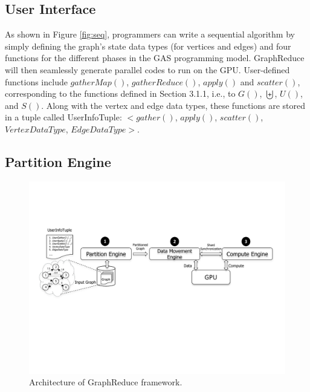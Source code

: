 \subsection{User Interface}
\label{interface}


As shown in Figure \ref{fig:seq}, programmers can write a sequential algorithm by simply defining the graph's state data types 
(for vertices and edges) and four functions for the different phases in the GAS programming model. 
GraphReduce will then seamlessly generate parallel codes to run on the GPU. User-defined functions 
include $gatherMap()$, $gatherReduce()$, $apply()$ and $scatter ()$, corresponding to the functions defined in Section 3.1.1,
i.e., to $G()$, $\biguplus$, $U()$, and $S()$. Along with the vertex and edge data types, these functions are stored in a tuple 
called UserInfoTuple: $<$$gather()$, $apply()$, $scatter()$, $VertexDataType$, $EdgeDataType$$>$.






\subsection{Partition Engine}
\label{partition}



\begin{figure}[!t]
\centering
\includegraphics[width=\textwidth,height=\textheight,keepaspectratio]{figures/big1.pdf}
\caption{Architecture of GraphReduce framework. }
\label{fig:big1}
\end{figure}




